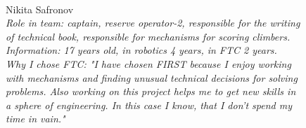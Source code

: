 \begin{figure}[H]
\begin{minipage}[h]{0.47\linewidth}
	\end{minipage}
	\vfill
	\begin{minipage}{0.47\linewidth}
		\\
	\end{minipage}
	\hfill
	\begin{minipage}{0.47\linewidth}
		Nikita Safronov\\
		\emph{Role in team: captain, reserve operator-2, responsible for the writing of technical book, responsible for mechanisms for scoring climbers.\\}
		\emph{Information: 17 years old, in robotics 4 years, in FTC 2 years.\\} 
		\emph{Why I chose FTC: "I have chosen FIRST because I enjoy working with mechanisms and finding unusual technical decisions for solving problems. Also working on this project helps me to get new skills in a sphere of engineering. In this case I know, that I don't spend my time in vain."}				
	\end{minipage}
\end{figure}

